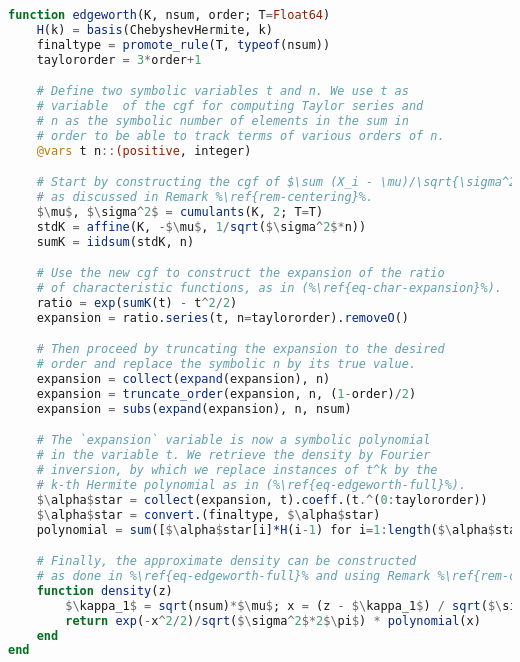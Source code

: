 \begin{lstlisting}[language=Julia, mathescape, escapechar=\%, caption={Symbolic implementation of the Edgeworth expansion}, label={lst-edgeworth}, basicstyle=\small]
function edgeworth(K, nsum, order; T=Float64)
    H(k) = basis(ChebyshevHermite, k)
    finaltype = promote_rule(T, typeof(nsum))
    taylororder = 3*order+1

    # Define two symbolic variables t and n. We use t as
    # variable  of the cgf for computing Taylor series and
    # n as the symbolic number of elements in the sum in
    # order to be able to track terms of various orders of n.
    @vars t n::(positive, integer)

    # Start by constructing the cgf of $\sum (X_i - \mu)/\sqrt{\sigma^2 n}$,
    # as discussed in Remark %\ref{rem-centering}%.
    $\mu$, $\sigma^2$ = cumulants(K, 2; T=T)
    stdK = affine(K, -$\mu$, 1/sqrt($\sigma^2$*n))
    sumK = iidsum(stdK, n)

    # Use the new cgf to construct the expansion of the ratio 
    # of characteristic functions, as in (%\ref{eq-char-expansion}%).
    ratio = exp(sumK(t) - t^2/2)
    expansion = ratio.series(t, n=taylororder).removeO()

    # Then proceed by truncating the expansion to the desired 
    # order and replace the symbolic n by its true value.
    expansion = collect(expand(expansion), n)
    expansion = truncate_order(expansion, n, (1-order)/2)
    expansion = subs(expand(expansion), n, nsum)

    # The `expansion` variable is now a symbolic polynomial 
    # in the variable t. We retrieve the density by Fourier 
    # inversion, by which we replace instances of t^k by the 
    # k-th Hermite polynomial as in (%\ref{eq-edgeworth-full}%).
    $\alpha$star = collect(expansion, t).coeff.(t.^(0:taylororder))
    $\alpha$star = convert.(finaltype, $\alpha$star)
    polynomial = sum([$\alpha$star[i]*H(i-1) for i=1:length($\alpha$star)])

    # Finally, the approximate density can be constructed
    # as done in %\ref{eq-edgeworth-full}% and using Remark %\ref{rem-centering}%.
    function density(z)
        $\kappa_1$ = sqrt(nsum)*$\mu$; x = (z - $\kappa_1$) / sqrt($\sigma^2$)
        return exp(-x^2/2)/sqrt($\sigma^2$*2$\pi$) * polynomial(x)
    end
end
\end{lstlisting}